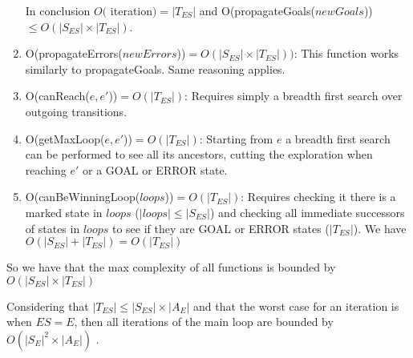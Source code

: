 \begin{enumerate}
	In conclusion $O($ 
	iteration$) = |T_{ES}|$  and  O(propagateGoals($newGoals$))$ \leq O(|S_{ES}| \times 
	|T_{ES}|)$.
	
	\item O(propagateErrors($newErrors$))$ = O(|S_{ES}| \times |T_{ES}|))$: This function 
	works similarly to propagateGoals. Same reasoning applies.
	
	
	\item O(canReach($e, e'$))$ = O(|T_{ES}|)$: Requires simply a breadth first search over 
	outgoing transitions.
	
	\item O(getMaxLoop($e, e'$))$ = O(|T_{ES}|)$: Starting from $e$  a breadth first search 
	can be performed to see all its ancestors, cutting the exploration when reaching $e'$  or a 
	GOAL or ERROR state. 
	
	
	\item O(canBeWinningLoop($loops$))$ = O(|T_{ES}|)$:  Requires checking it there is a 
	marked state in $loops$ ($|loops| \leq |S_{ES}|$) and checking all immediate 
	successors of states in $loops$ to see if they are GOAL or ERROR states ($|T_{ES}|$).  
	We have  $O(|S_{ES}| + |T_{ES}|) = O(|T_{ES}|)$
	
	
	
\end{enumerate}

So we have that the max complexity of all functions is bounded by $O(|S_{ES}| \times |T_{ES}|)$  

Considering that $|T_{ES}| \leq|S_{ES}|\times|A_E|$ and that the worst case for an 
iteration is when $ES=E$, then all iterations of the main loop are bounded by 
$O(|S_E|^2\times|A_E|)$ .

